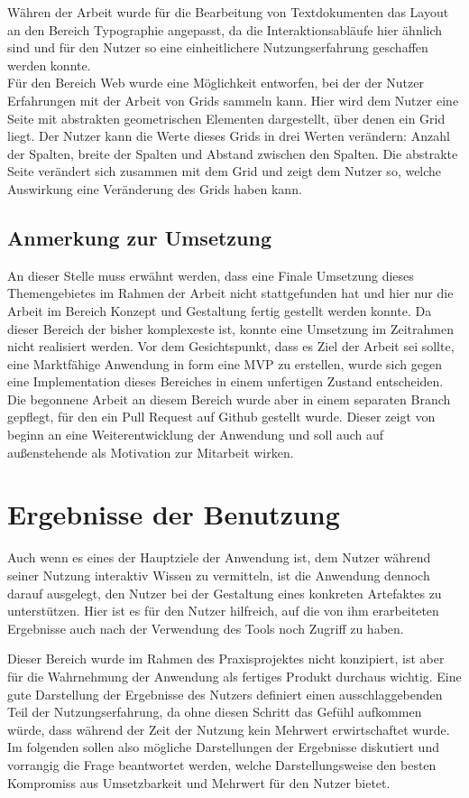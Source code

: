 Währen der Arbeit wurde für die Bearbeitung von Textdokumenten das Layout an den Bereich Typographie angepasst, da die Interaktionsabläufe hier ähnlich sind und für den Nutzer so eine einheitlichere Nutzungserfahrung geschaffen werden konnte.\\
Für den Bereich Web wurde eine Möglichkeit entworfen, bei der der Nutzer Erfahrungen mit der Arbeit von Grids sammeln kann. Hier wird dem Nutzer eine Seite mit abstrakten geometrischen Elementen dargestellt, über denen ein Grid liegt. Der Nutzer kann die Werte dieses Grids in drei Werten verändern: Anzahl der Spalten, breite der Spalten und Abstand zwischen den Spalten. Die abstrakte Seite verändert sich zusammen mit dem Grid und zeigt dem Nutzer so, welche Auswirkung eine Veränderung des Grids haben kann.

\subsection{Anmerkung zur Umsetzung}
An dieser Stelle muss erwähnt werden, dass eine Finale Umsetzung dieses Themengebietes im Rahmen der Arbeit nicht stattgefunden hat und hier nur die Arbeit im Bereich Konzept und Gestaltung fertig gestellt werden konnte.
Da dieser Bereich der bisher komplexeste ist, konnte eine Umsetzung im Zeitrahmen nicht realisiert werden. Vor dem Gesichtspunkt, dass es Ziel der Arbeit sei sollte, eine Marktfähige Anwendung in form eine MVP zu erstellen, wurde sich gegen eine Implementation dieses Bereiches in einem unfertigen Zustand entscheiden.\\
Die begonnene Arbeit an diesem Bereich wurde aber in einem separaten Branch gepflegt, für den ein Pull Request auf Github gestellt wurde.
Dieser zeigt von beginn an eine Weiterentwicklung der Anwendung und soll auch auf außenstehende als Motivation zur Mitarbeit wirken.

\section{Ergebnisse der Benutzung}
Auch wenn es eines der Hauptziele der Anwendung ist, dem Nutzer während seiner Nutzung interaktiv Wissen zu vermitteln, ist die Anwendung dennoch darauf ausgelegt, den Nutzer bei der Gestaltung eines konkreten Artefaktes zu unterstützen. Hier ist es für den Nutzer hilfreich, auf die von ihm erarbeiteten Ergebnisse auch nach der Verwendung des Tools noch Zugriff zu haben.

Dieser Bereich wurde im Rahmen des Praxisprojektes nicht konzipiert, ist aber für die Wahrnehmung der Anwendung als fertiges Produkt durchaus wichtig. Eine gute Darstellung der Ergebnisse des Nutzers definiert einen ausschlaggebenden Teil der Nutzungserfahrung, da ohne diesen Schritt das Gefühl aufkommen würde, dass während der Zeit der Nutzung kein Mehrwert erwirtschaftet wurde.
Im folgenden sollen also mögliche Darstellungen der Ergebnisse diskutiert und vorrangig die Frage beantwortet werden, welche Darstellungsweise den besten Kompromiss aus Umsetzbarkeit und Mehrwert für den Nutzer bietet.

